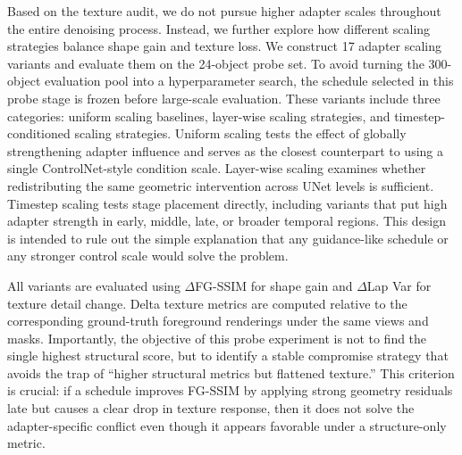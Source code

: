 \documentclass[times,twocolumn,final]{elsarticle}
\begin{document}
Based on the texture audit, we do not pursue higher adapter scales throughout the entire denoising process. Instead, we further explore how different scaling strategies balance shape gain and texture loss. We construct 17 adapter scaling variants and evaluate them on the 24-object probe set. To avoid turning the 300-object evaluation pool into a hyperparameter search, the schedule selected in this probe stage is frozen before large-scale evaluation. These variants include three categories: uniform scaling baselines, layer-wise scaling strategies, and timestep-conditioned scaling strategies. Uniform scaling tests the effect of globally strengthening adapter influence and serves as the closest counterpart to using a single ControlNet-style condition scale. Layer-wise scaling examines whether redistributing the same geometric intervention across UNet levels is sufficient. Timestep scaling tests stage placement directly, including variants that put high adapter strength in early, middle, late, or broader temporal regions. This design is intended to rule out the simple explanation that any guidance-like schedule or any stronger control scale would solve the problem.

All variants are evaluated using $\Delta$FG-SSIM for shape gain and $\Delta$Lap Var for texture detail change. Delta texture metrics are computed relative to the corresponding ground-truth foreground renderings under the same views and masks. Importantly, the objective of this probe experiment is not to find the single highest structural score, but to identify a stable compromise strategy that avoids the trap of ``higher structural metrics but flattened texture.'' This criterion is crucial: if a schedule improves FG-SSIM by applying strong geometry residuals late but causes a clear drop in texture response, then it does not solve the adapter-specific conflict even though it appears favorable under a structure-only metric.
\end{document}
